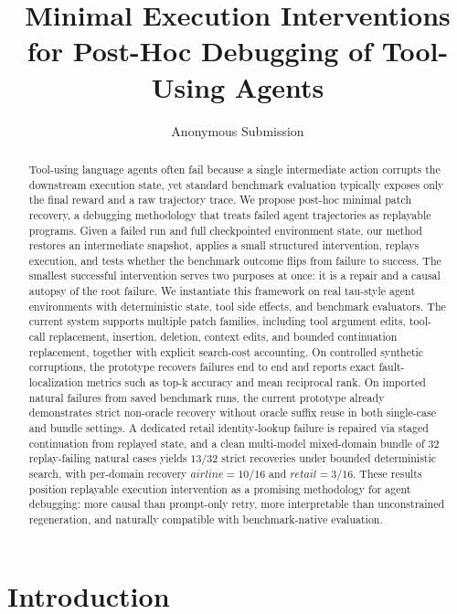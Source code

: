 \documentclass[11pt]{article}
\title{Minimal Execution Interventions for Post-Hoc Debugging of Tool-Using Agents}
\author{Anonymous Submission}
\begin{document}
\maketitle

\begin{abstract}
Tool-using language agents often fail because a single intermediate action
corrupts the downstream execution state, yet standard benchmark evaluation
typically exposes only the final reward and a raw trajectory trace. We propose
post-hoc minimal patch recovery, a debugging methodology that treats failed
agent trajectories as replayable programs. Given a failed run and full
checkpointed environment state, our method restores an intermediate snapshot,
applies a small structured intervention, replays execution, and tests whether
the benchmark outcome flips from failure to success. The smallest successful
intervention serves two purposes at once: it is a repair and a causal autopsy
of the root failure. We instantiate this framework on real tau-style agent
environments with deterministic state, tool side effects, and benchmark
evaluators. The current system supports multiple patch families, including tool
argument edits, tool-call replacement, insertion, deletion, context edits, and
bounded continuation replacement, together with explicit search-cost
accounting. On controlled synthetic corruptions, the prototype recovers
failures end to end and reports exact fault-localization metrics such as top-k
accuracy and mean reciprocal rank. On imported natural failures from saved
benchmark runs, the current prototype already demonstrates strict non-oracle
recovery without oracle suffix reuse in both single-case and bundle settings.
A dedicated retail identity-lookup failure is repaired via staged continuation
from replayed state, and a clean multi-model mixed-domain bundle of $32$
replay-failing natural cases yields $13/32$ strict recoveries under bounded
deterministic search, with per-domain recovery $\textit{airline}=10/16$ and
$\textit{retail}=3/16$. These results position replayable execution
intervention as a promising methodology for agent debugging: more causal than
prompt-only retry, more interpretable than unconstrained regeneration, and
naturally compatible with benchmark-native evaluation.
\end{abstract}

\section{Introduction}
\end{document}
